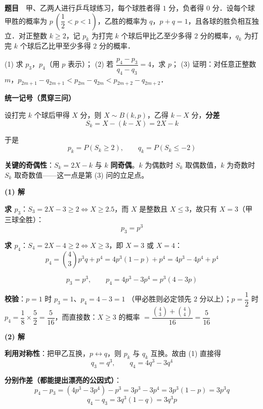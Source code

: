\par\medskip


\textbf{题目}　甲、乙两人进行乒乓球练习，每个球胜者得 $1$ 分，负者得 $0$ 分．设每个球甲胜的概率为 $p\ \left(\dfrac12<p<1\right)$，乙胜的概率为 $q$，$p+q=1$，且各球的胜负相互独立．对正整数 $k\ge 2$，记 $p_k$ 为打完 $k$ 个球后甲比乙至少多得 $2$ 分的概率，$q_k$ 为打完 $k$ 个球后乙比甲至少多得 $2$ 分的概率．

  (1) 求 $p_3$，$p_4$（用 $p$ 表示）；
  (2) 若 $\dfrac{p_4-p_3}{q_4-q_3}=4$，求 $p$；
  (3) 证明：对任意正整数 $m$，$p_{2m+1}-q_{2m+1}<p_{2m}-q_{2m}<p_{2m+2}-q_{2m+2}$．

\par\medskip

\textbf{统一记号（贯穿三问）}

设打完 $k$ 个球后甲得 $X$ 分，则 $X\sim B(k,p)$，乙得 $k-X$ 分，\textbf{分差}
\[S_k=X-(k-X)=2X-k\]

于是
\[p_k=P\left(S_k\ge2\right),\qquad q_k=P\left(S_k\le-2\right)\]

\textbf{关键的奇偶性}：$S_k=2X-k$ 与 $k$ \textbf{同奇偶}。$k$ 为偶数时 $S_k$ 取偶数值，$k$ 为奇数时 $S_k$ 取奇数值——这一点是第 (3) 问的立足点。

\par\medskip

\textbf{(1) 解}

\textbf{求 $p_3$}：$S_3=2X-3\ge2\iff X\ge2.5$，而 $X$ 是整数且 $X\le3$，故只有 $X=3$（甲三球全胜）：
\[p_3=p^3\]

\textbf{求 $p_4$}：$S_4=2X-4\ge2\iff X\ge3$，即 $X=3$ 或 $X=4$：
\[p_4=\binom43p^3q+p^4=4p^3(1-p)+p^4=4p^3-4p^4+p^4\]

\[\boxed{p_3=p^3,\qquad p_4=4p^3-3p^4=p^3(4-3p)}\]

\textbf{校验}：$p=1$ 时 $p_3=1$、$p_4=4-3=1$ （甲必胜则必定领先 $2$ 分以上）；$p=\dfrac12$ 时 $p_4=\dfrac18\times\dfrac52=\dfrac5{16}$，而直接数：$X\ge3$ 的概率 $=\dfrac{\binom43+\binom44}{16}=\dfrac{5}{16}$ 

\par\medskip

\textbf{(2) 解}

\textbf{利用对称性}：把甲乙互换，$p\leftrightarrow q$，则 $p_k$ 与 $q_k$ 互换。故由 (1) 直接得
\[q_3=q^3,\qquad q_4=4q^3-3q^4\]

\textbf{分别作差（都能提出漂亮的公因式）}：
\[p_4-p_3=\left(4p^3-3p^4\right)-p^3=3p^3-3p^4=3p^3(1-p)=3p^3q\]
\[q_4-q_3=3q^3(1-q)=3q^3p\]

